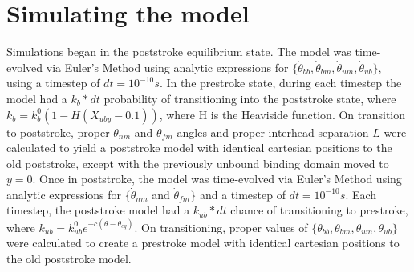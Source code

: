 \documentclass[9pt,twocolumn,twoside]{article}
\begin{document}


\section*{Simulating the model}
Simulations began in the poststroke equilibrium state. The model was time-evolved via Euler's Method using analytic expressions for $\{\dot{\theta}_{bb}, \dot{\theta}_{bm}, \dot{\theta}_{um}, \dot{\theta}_{ub}\}$, using a timestep of $dt = 10^{-10}s$. In the prestroke state, during each timestep the model had a $k_b*dt$ probability of transitioning into the poststroke state, where $k_b = k_b^0\left(1-H\left(X_{uby}-0.1\right)\right)$, where H is the Heaviside function. On transition to poststroke, proper $\theta_{nm}$ and $\theta_{fm}$ angles and proper interhead separation $L$ were calculated to yield a poststroke model with identical cartesian positions to the old poststroke, except with the previously unbound binding domain moved to $y=0$. Once in poststroke, the model was time-evolved via Euler's Method using analytic expressions for $\{\dot{\theta}_{nm}$ and $\dot{\theta}_{fm}\}$ and a timestep of $dt=10^{-10}s$. Each timestep, the poststroke model had a $k_{ub}*dt$ chance of transitioning to prestroke, where $k_{ub} = k^0_{ub}e^{-c(\theta-\theta_{eq})}$. On transitioning, proper values of $\{\theta_{bb}, \theta_{bm}, \theta_{um}, \theta_{ub}\}$ were calculated to create a prestroke model with identical cartesian positions to the old poststroke model.

\end{document}
